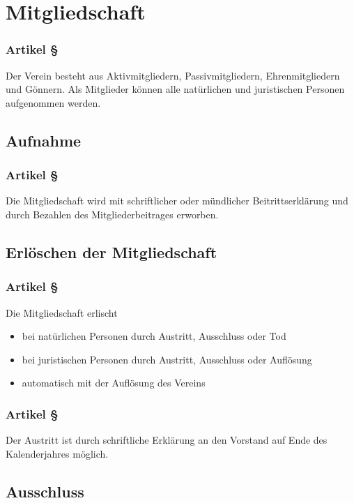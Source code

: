 \section{Mitgliedschaft}

\subsubsection*{Artikel §\articlenumber}
Der Verein besteht aus Aktivmitgliedern, Passivmitgliedern, Ehrenmitgliedern
und Gönnern. Als Mitglieder können alle natürlichen und juristischen Personen
aufgenommen werden.

\subsection{Aufnahme}

\subsubsection*{Artikel §\articlenumber}
Die Mitgliedschaft wird mit schriftlicher oder mündlicher Beitrittserklärung
und durch Bezahlen des Mitgliederbeitrages erworben.

\subsection{Erlöschen der Mitgliedschaft}

\subsubsection*{Artikel §\articlenumber}
Die Mitgliedschaft erlischt
\begin{itemize}
	\item bei natürlichen Personen durch Austritt, Ausschluss 
		oder Tod
	\item bei juristischen Personen durch Austritt, Ausschluss 
		oder Auflösung
	\item automatisch mit der Auflösung des Vereins
\end{itemize}

\subsubsection*{Artikel §\articlenumber}
Der Austritt ist durch schriftliche Erklärung an den Vorstand auf Ende des
Kalenderjahres möglich.

\subsection{Ausschluss}

